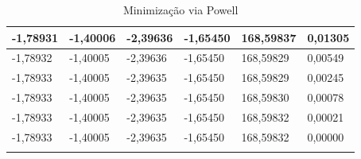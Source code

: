 \documentclass[a4paper, 12pt]{article}
\begin{document}
\begin{longtable}[c]{|l|l|l|l|l|l|}
-1,78931                   & -1,40006                  & -2,39636                  & -1,65450                  & 168,59837                 & 0,01305                   \\ \hline
-1,78932                   & -1,40005                  & -2,39636                  & -1,65450                  & 168,59829                 & 0,00549                   \\ \hline
-1,78933                   & -1,40005                  & -2,39635                  & -1,65450                  & 168,59829                 & 0,00245                   \\ \hline
-1,78933                   & -1,40005                  & -2,39635                  & -1,65450                  & 168,59830                 & 0,00078                   \\ \hline
-1,78933                   & -1,40005                  & -2,39635                  & -1,65450                  & 168,59832                 & 0,00021                   \\ \hline
-1,78933                   & -1,40005                  & -2,39635                  & -1,65450                  & 168,59832                 & 0,00000                   \\ \hline
\caption{Minimização via Powell}
\label{tab:Q5B-Powell}\\
\end{longtable}
\end{document}

